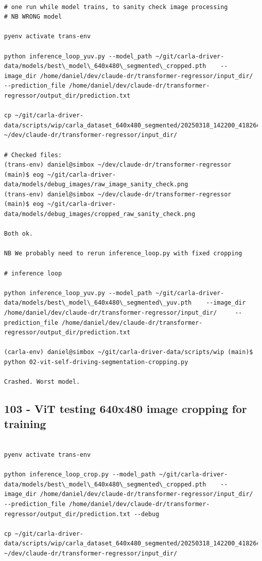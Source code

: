\begin{verbatim}

# one run while model trains, to sanity check image processing
# NB WRONG model

pyenv activate trans-env

python inference_loop_yuv.py --model_path ~/git/carla-driver-data/models/best\_model\_640x480\_segmented\_cropped.pth    --image_dir /home/daniel/dev/claude-dr/transformer-regressor/input_dir/     --prediction_file /home/daniel/dev/claude-dr/transformer-regressor/output_dir/prediction.txt

cp ~/git/carla-driver-data/scripts/wip/carla_dataset_640x480_segmented/20250318_142200_418264_steering_0.0000.jpg ~/dev/claude-dr/transformer-regressor/input_dir/

# Checked files:
(trans-env) daniel@simbox ~/dev/claude-dr/transformer-regressor (main)$ eog ~/git/carla-driver-data/models/debug_images/raw_image_sanity_check.png
(trans-env) daniel@simbox ~/dev/claude-dr/transformer-regressor (main)$ eog ~/git/carla-driver-data/models/debug_images/cropped_raw_sanity_check.png 

Both ok.

NB We probably need to rerun inference_loop.py with fixed cropping

# inference loop

python inference_loop_yuv.py --model_path ~/git/carla-driver-data/models/best\_model\_640x480\_segmented\_yuv.pth    --image_dir /home/daniel/dev/claude-dr/transformer-regressor/input_dir/     --prediction_file /home/daniel/dev/claude-dr/transformer-regressor/output_dir/prediction.txt

(carla-env) daniel@simbox ~/git/carla-driver-data/scripts/wip (main)$ python 02-vit-self-driving-segmentation-cropping.py 

Crashed. Worst model.

\end{verbatim}

\subsection{103 - ViT testing 640x480 image cropping for training}
\label{app_res:103}

\begin{verbatim}

pyenv activate trans-env

python inference_loop_crop.py --model_path ~/git/carla-driver-data/models/best\_model\_640x480\_segmented\_cropped.pth    --image_dir /home/daniel/dev/claude-dr/transformer-regressor/input_dir/     --prediction_file /home/daniel/dev/claude-dr/transformer-regressor/output_dir/prediction.txt --debug

cp ~/git/carla-driver-data/scripts/wip/carla_dataset_640x480_segmented/20250318_142200_418264_steering_0.0000.jpg ~/dev/claude-dr/transformer-regressor/input_dir/


\end{verbatim}




